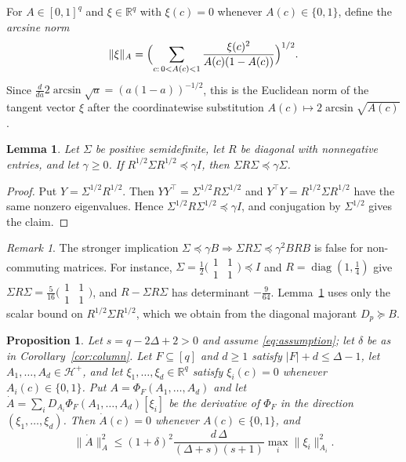 \documentclass{amsart}
\numberwithin{equation}{section}
\theoremstyle{plain}
\newtheorem{proposition}[theorem]{Proposition}
\newtheorem{lemma}[theorem]{Lemma}
\theoremstyle{definition}
\theoremstyle{remark}
\newtheorem{remark}[theorem]{Remark}
\newcommand{\R}{\mathbb{R}}
\newcommand{\diag}{\operatorname{diag}}
\newcommand{\cH}{\mathcal{H}}
\newcommand{\T}{\top}
\begin{document}
For $A\in[0,1]^q$ and $\xi\in\R^q$ with $\xi(c)=0$ whenever $A(c)\in\{0,1\}$, define the \emph{arcsine norm}
\[
\|\xi\|_A=\Bigl(\sum_{c:\,0<A(c)<1}\frac{\xi(c)^2}{A(c)(1-A(c))}\Bigr)^{1/2}.
\]
Since $\frac{d}{da}2\arcsin\sqrt a=(a(1-a))^{-1/2}$, this is the Euclidean norm of the tangent vector $\xi$ after the coordinatewise substitution $A(c)\mapsto2\arcsin\sqrt{A(c)}$.

\begin{lemma}\label{lem:transfer}
Let $\Sigma$ be positive semidefinite, let $R$ be diagonal with nonnegative entries, and let $\gamma\ge0$. If $R^{1/2}\Sigma R^{1/2}\preceq\gamma I$, then $\Sigma R\Sigma\preceq\gamma\Sigma$.
\end{lemma}

\begin{proof}
Put $Y=\Sigma^{1/2}R^{1/2}$. Then $YY^\T=\Sigma^{1/2}R\Sigma^{1/2}$ and $Y^\T Y=R^{1/2}\Sigma R^{1/2}$ have the same nonzero eigenvalues. Hence $\Sigma^{1/2}R\Sigma^{1/2}\preceq\gamma I$, and conjugation by $\Sigma^{1/2}$ gives the claim.
\end{proof}

\begin{remark}\label{rem:counterexample}
The stronger implication $\Sigma\preceq\gamma B\Rightarrow\Sigma R\Sigma\preceq\gamma^2BRB$ is false for non-commuting matrices. For instance, $\Sigma=\frac12\bigl(\begin{smallmatrix}1&1\\1&1\end{smallmatrix}\bigr)\preceq I$ and $R=\diag(1,\frac14)$ give $\Sigma R\Sigma=\frac5{16}\bigl(\begin{smallmatrix}1&1\\1&1\end{smallmatrix}\bigr)$, and $R-\Sigma R\Sigma$ has determinant $-\frac9{64}$. Lemma~\ref{lem:transfer} uses only the scalar bound on $R^{1/2}\Sigma R^{1/2}$, which we obtain from the diagonal majorant $D_p\succeq B$.
\end{remark}

\begin{proposition}\label{prop:contraction}
Let $s=q-2\Delta+2>0$ and assume \eqref{eq:assumption}; let $\delta$ be as in Corollary~\ref{cor:column}. Let $F\subseteq[q]$ and $d\ge1$ satisfy $|F|+d\le\Delta-1$, let $A_1,\dots,A_d\in\cH^+$, and let $\xi_1,\dots,\xi_d\in\R^q$ satisfy $\xi_i(c)=0$ whenever $A_i(c)\in\{0,1\}$. Put $A=\Phi_F(A_1,\dots,A_d)$ and let $\dot A=\sum_iD_{A_i}\Phi_F(A_1,\dots,A_d)[\xi_i]$ be the derivative of $\Phi_F$ in the direction $(\xi_1,\dots,\xi_d)$. Then $\dot A(c)=0$ whenever $A(c)\in\{0,1\}$, and
\[
\|\dot A\|_A^2\le(1+\delta)^2\frac{d\,\Delta}{(\Delta+s)(s+1)}\max_i\|\xi_i\|_{A_i}^2 .
\]
\end{proposition}
\end{document}
